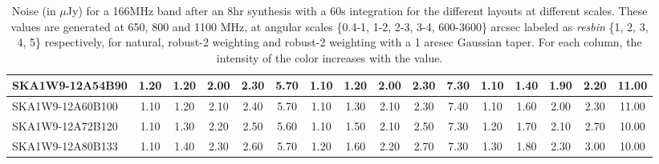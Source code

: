 \begin{table}[H]
{{\begin{tabular}{|lccccc||ccccc||ccccc|}
SKA1W9-12A54B90 & 1.20 \cellcolor{blue!28.50} & 1.20 \cellcolor{red!18.00} & 2.00 \cellcolor{green!18.00} & 2.30 \cellcolor{orange!18.00} & 5.70 \cellcolor{purple!60.00} & 1.10 \cellcolor{blue!18.00} & 1.20 \cellcolor{red!18.00} & 2.00 \cellcolor{green!18.00} & 2.30 \cellcolor{orange!18.00} & 7.30 \cellcolor{purple!49.50} & 1.10 \cellcolor{blue!18.00} & 1.40 \cellcolor{red!18.00} & 1.90 \cellcolor{green!18.00} & 2.20 \cellcolor{orange!18.00} & 11.00 \cellcolor{purple!60.00}\\ \hline 
SKA1W9-12A60B100 & 1.10 \cellcolor{blue!18.00} & 1.20 \cellcolor{red!18.00} & 2.10 \cellcolor{green!28.50} & 2.40 \cellcolor{orange!32.00} & 5.70 \cellcolor{purple!60.00} & 1.10 \cellcolor{blue!18.00} & 1.30 \cellcolor{red!24.00} & 2.10 \cellcolor{green!32.00} & 2.30 \cellcolor{orange!18.00} & 7.40 \cellcolor{purple!60.00} & 1.10 \cellcolor{blue!18.00} & 1.60 \cellcolor{red!34.80} & 2.00 \cellcolor{green!28.50} & 2.30 \cellcolor{orange!23.25} & 11.00 \cellcolor{purple!60.00}\\ \hline 
SKA1W9-12A72B120 & 1.10 \cellcolor{blue!18.00} & 1.30 \cellcolor{red!24.00} & 2.20 \cellcolor{green!39.00} & 2.50 \cellcolor{orange!46.00} & 5.60 \cellcolor{purple!39.00} & 1.10 \cellcolor{blue!18.00} & 1.50 \cellcolor{red!36.00} & 2.10 \cellcolor{green!32.00} & 2.50 \cellcolor{orange!39.00} & 7.30 \cellcolor{purple!49.50} & 1.20 \cellcolor{blue!28.50} & 1.70 \cellcolor{red!43.20} & 2.10 \cellcolor{green!39.00} & 2.70 \cellcolor{orange!44.25} & 10.00 \cellcolor{purple!18.00}\\ \hline 
SKA1W9-12A80B133 & 1.10 \cellcolor{blue!18.00} & 1.40 \cellcolor{red!30.00} & 2.30 \cellcolor{green!49.50} & 2.60 \cellcolor{orange!60.00} & 5.70 \cellcolor{purple!60.00} & 1.20 \cellcolor{blue!28.50} & 1.60 \cellcolor{red!42.00} & 2.20 \cellcolor{green!46.00} & 2.70 \cellcolor{orange!60.00} & 7.30 \cellcolor{purple!49.50} & 1.30 \cellcolor{blue!39.00} & 1.80 \cellcolor{red!51.60} & 2.30 \cellcolor{green!60.00} & 3.00 \cellcolor{orange!60.00} & 10.00 \cellcolor{purple!18.00}\\ \hline 
\end{tabular}}
\vspace{-0.300000cm}
\hspace{1cm} 

\vspace{.50cm}
\caption{Noise (in $\mu$Jy) for a 166MHz band after an 8hr synthesis with a 60s integration for the different layouts at different scales. These values are generated at 650, 800 and 1100 MHz, at angular scales \{0.4-1, 1-2, 2-3, 3-4, 600-3600\} arcsec labeled as {\it resbin} \{1, 2, 3, 4, 5\} respectively, for natural, robust-2 weighting and robust-2 weighting with a 1 arcsec Gaussian taper. For each column, the intensity of the color increases with the value.}\label{tab:noise166}}
 \end{table}
